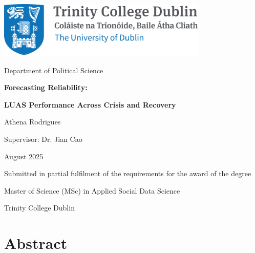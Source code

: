 \begin{titlepage}
    \centering
    \includegraphics[width=10cm]{figures/paper_figures/tcd-logo.png}\par
    \vspace{1cm}

    {\large Department of Political Science\par}

    \vspace{2.5cm}

    {\LARGE\bfseries Forecasting Reliability:\par}
    \vspace{0.3cm}
    {\Large\bfseries LUAS Performance Across Crisis and Recovery\par}

    \vspace{3cm}

    {\Large Athena Rodrigues\par}

    \vspace{1.5cm}

    {\large Supervisor: Dr. Jian Cao\par}
    \vspace{0.5cm}
    {\large August 2025\par}

    \vspace{2cm}

    {\large Submitted in partial fulfilment of the requirements for the award of the degree\par}
    \vspace{0.3cm}
    {\large Master of Science (MSc) in Applied Social Data Science\par}
    \vspace{0.3cm}
    {\large Trinity College Dublin\par}
\end{titlepage}

\clearpage
\thispagestyle{plain}


\section*{Abstract}


